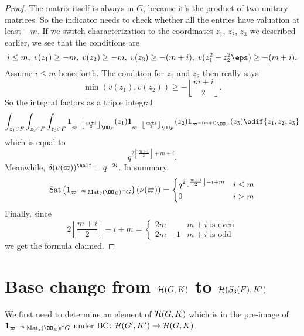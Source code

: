 \begin{proof}
  The matrix itself is always in $G$, because it's the product of two unitary matrices.
  So the indicator needs to check whether all the entries have valuation at least $-m$.
  If we switch characterization to the coordinates $z_1$, $z_2$, $z_3$ we described earlier,
  we see that the conditions are
  \[ i \le m, \; v(z_1) \ge -m, \; v(z_2) \ge -m, \; v(z_3) \ge -(m+i), \;
    v(z_1^2 + z_2^2 \eps) \ge -(m+i). \]
  Assume $i \le m$ henceforth.
  The condition for $z_1$ and $z_2$ then really says
  \[ \min(v(z_1), v(z_2)) \ge -\left\lfloor \frac{m+i}{2} \right\rfloor. \]
  So the integral factors as a triple integral
  \[
    \int_{z_1 \in F}
    \int_{z_2 \in F}
    \int_{z_3 \in F}
    \mathbf{1}_{\varpi^{-\left\lfloor \frac{m+i}{2} \right\rfloor} \OO_F}(z_1)
    \mathbf{1}_{\varpi^{-\left\lfloor \frac{m+i}{2} \right\rfloor} \OO_F}(z_2)
    \mathbf{1}_{\varpi^{-(m+i)} \OO_F}(z_3)
    \odif{z_1,z_2,z_3}
  \]
  which is equal to
  \[ q^{2\left\lfloor \frac{m+i}{2} \right\rfloor+m+i}. \]
  Meanwhile, $\delta(\nu(\varpi))^{\half} = q^{-2i}$.
  In summary,
  \[
    \Sat\left( \mathbf{1}_{\varpi^{-m} \Mat_3(\OO_E) \cap G}\right) \left( \nu(\varpi) \right)
    =
    \begin{cases}
      q^{2\left\lfloor \frac{m+i}{2} \right\rfloor - i + m} & i \le m \\
      0 & i > m
    \end{cases}
  \]
  Finally, since
  \[ 2\left\lfloor \frac{m+i}{2} \right\rfloor - i + m
    = \begin{cases}
      2m & m+i \text{ is even} \\
      2m-1 & m+i \text{ is odd}
    \end{cases}
  \]
  we get the formula claimed.
\end{proof}

\section{Base change from $\mathcal H(G,K)$ to $\mathcal H(S_3(F), K')$}
We first need to determine an element of $\mathcal H(G,K)$
which is in the pre-image of $\mathbf{1}_{\varpi^{-m} \Mat_3(\OO_E) \cap G}$
under $\operatorname{BC} \colon \mathcal H(G', K') \to \mathcal H(G, K)$.

